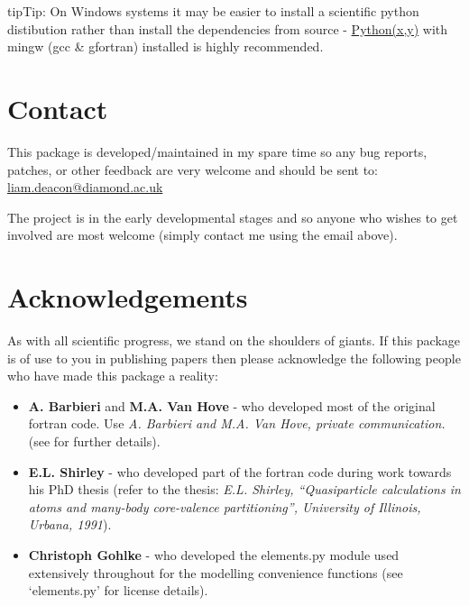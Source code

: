 \documentclass[letterpaper,10pt,english]{sphinxmanual}
\begin{document}
\begin{notice}{tip}{Tip:}
On Windows systems it may be easier to install a scientific python distibution
rather than install the dependencies from source - \href{http://code.google.com/p/pythonxy}{Python(x,y)} with mingw (gcc \& gfortran)
installed is highly recommended.
\end{notice}


\chapter{Contact}
\label{contact:contact}\label{contact::doc}\label{contact:id1}
This package is developed/maintained in my spare time so any bug reports, patches,
or other feedback are very welcome and should be sent to: \href{mailto:liam.deacon@diamond.ac.uk}{liam.deacon@diamond.ac.uk}

The project is in the early developmental stages and so anyone who wishes to get
involved are most welcome (simply contact me using the email above).


\chapter{Acknowledgements}
\label{acknowledgements:acknowledgements}\label{acknowledgements::doc}\label{acknowledgements:id1}
As with all scientific progress, we stand on the shoulders of giants. If this
package is of use to you in publishing papers then please acknowledge the
following people who have made this package a reality:
\begin{itemize}
\item {} 
\textbf{A. Barbieri} and \textbf{M.A. Van Hove} - who developed most of the original
fortran code. Use \emph{A. Barbieri and M.A. Van Hove, private communication.}
(see  for further details).

\item {} 
\textbf{E.L. Shirley} - who developed part of the fortran code during work towards his
PhD thesis (refer to the thesis: \emph{E.L. Shirley, ``Quasiparticle calculations in
atoms and many-body core-valence partitioning'', University of Illinois, Urbana, 1991}).

\item {} 
\textbf{Christoph Gohlke} - who developed the elements.py module used extensively throughout
for the modelling convenience functions (see `elements.py' for license details).

\end{itemize}
\end{document}
